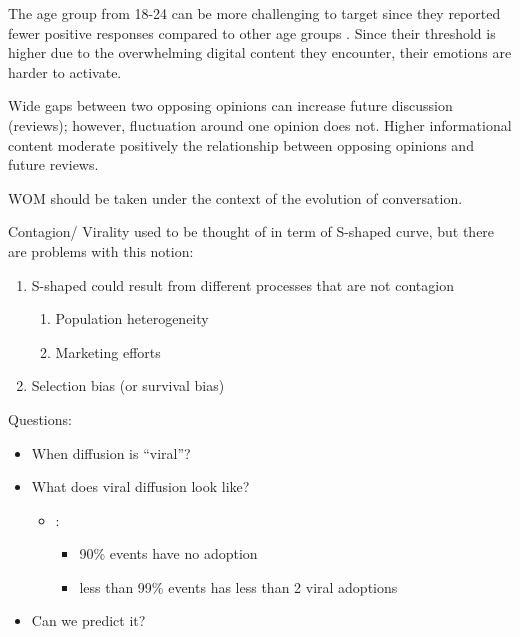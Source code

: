 \documentclass[
]{book}
\begin{document}
The age group from 18-24 can be more challenging to target since they reported fewer positive responses compared to other age groups \citep{Libert_2014}. Since their threshold is higher due to the overwhelming digital content they encounter, their emotions are harder to activate.

Wide gaps between two opposing opinions can increase future discussion (reviews); however, fluctuation around one opinion does not. Higher informational content moderate positively the relationship between opposing opinions and future reviews. \citep{Nagle_2014}

WOM should be taken under the context of the evolution of conversation. \citep{Berger_2014}

Contagion/ Virality used to be thought of in term of S-shaped curve, but there are problems with this notion:

\begin{enumerate}
\def\labelenumi{\arabic{enumi}.}
\item
  S-shaped could result from different processes that are not contagion

  \begin{enumerate}
  \def\labelenumii{\arabic{enumii}.}
  \item
    Population heterogeneity \citep{Chatterjee_1990}
  \item
    Marketing efforts \citep{Van_den_Bulte_2001}
  \end{enumerate}
\item
  Selection bias (or survival bias)
\end{enumerate}

Questions:

\begin{itemize}
\item
  When diffusion is ``viral''?
\item
  What does viral diffusion look like?

  \begin{itemize}
  \item
    \citep{Goel_2012}:

    \begin{itemize}
    \item
      90\% events have no adoption
    \item
      less than 99\% events has less than 2 viral adoptions
    \end{itemize}
  \end{itemize}
\item
  Can we predict it?
\end{itemize}
\end{document}
